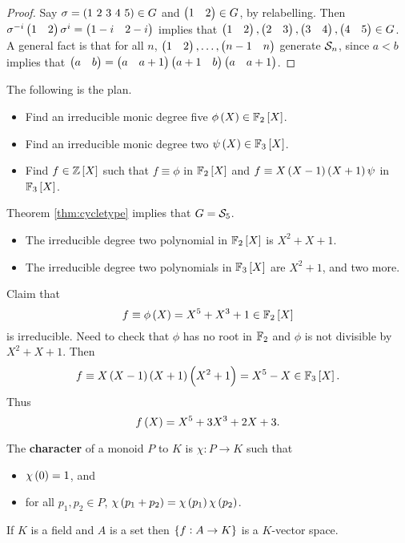 \begin{proof}
Say $ \sigma = \br{1 \ 2 \ 3 \ 4 \ 5} \in G $ and $ \begin{pmatrix} 1 & 2 \end{pmatrix} \in G $, by relabelling. Then $ \sigma^{-i}\begin{pmatrix} 1 & 2 \end{pmatrix}\sigma^i = \begin{pmatrix} 1 - i & 2 - i \end{pmatrix} $ implies that $ \begin{pmatrix} 1 & 2 \end{pmatrix}, \begin{pmatrix} 2 & 3 \end{pmatrix}, \begin{pmatrix} 3 & 4 \end{pmatrix}, \begin{pmatrix} 4 & 5 \end{pmatrix} \in G $. A general fact is that for all $ n $, $ \begin{pmatrix} 1 & 2 \end{pmatrix}, \dots, \begin{pmatrix} n - 1 & n \end{pmatrix} $ generate $ \mathcal{S}_n $, since $ a < b $ implies that $ \begin{pmatrix} a & b \end{pmatrix} = \begin{pmatrix} a & a + 1 \end{pmatrix}\begin{pmatrix} a + 1 & b \end{pmatrix}\begin{pmatrix} a & a + 1 \end{pmatrix} $.
\end{proof}

The following is the plan.
\begin{itemize}
\item Find an irreducible monic degree five $ \phi\br{X} \in \FF_2\sbr{X} $.
\item Find an irreducible monic degree two $ \psi\br{X} \in \FF_3\sbr{X} $.
\item Find $ f \in \ZZ\sbr{X} $ such that $ f \equiv \phi $ in $ \FF_2\sbr{X} $ and $ f \equiv X\br{X - 1}\br{X + 1}\psi $ in $ \FF_3\sbr{X} $.
\end{itemize}
Theorem \ref{thm:cycletype} implies that $ G = \mathcal{S}_5 $.
\begin{itemize}
\item The irreducible degree two polynomial in $ \FF_2\sbr{X} $ is $ X^2 + X + 1 $.
\item The irreducible degree two polynomials in $ \FF_3\sbr{X} $ are $ X^2 + 1 $, and two more.
\end{itemize}
Claim that
$$ f \equiv \phi\br{X} = X^5 + X^3 + 1 \in \FF_2\sbr{X} $$
is irreducible. Need to check that $ \phi $ has no root in $ \mathbb{F}_2 $ and $ \phi $ is not divisible by $ X^2 + X + 1 $. Then
$$ f \equiv X\br{X - 1}\br{X + 1}\br{X^2 + 1} = X^5 - X \in \FF_3\sbr{X}. $$
Thus
$$ f\br{X} = X^5 + 3X^3 + 2X + 3. $$


\begin{definition}
The \textbf{character} of a monoid $ P $ to $ K $ is $ \chi : P \to K $ such that
\begin{itemize}
\item $ \chi\br{0} = 1 $, and
\item for all $ p_1, p_2 \in P $, $ \chi\br{p_1 + p_2} = \chi\br{p_1}\chi\br{p_2} $.
\end{itemize}
\end{definition}

\begin{remark*}
If $ K $ is a field and $ A $ is a set then $ \cbr{f : A \to K} $ is a $ K $-vector space.
\end{remark*}

